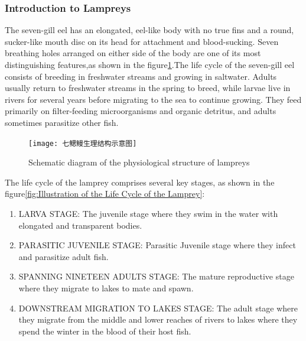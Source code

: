 \documentclass[CTeX = true]{mcmthesis}  %
\begin{document}
\subsubsection*{Introduction to Lampreys}
The seven-gill eel has an elongated, eel-like body with no true fins and a round, sucker-like mouth disc on its head for attachment and blood-sucking. Seven breathing holes arranged on either side of the body are one of its most distinguishing features,as shown in the figure\ref{fig:Schematic diagram of the physiological structure of lampreys}.The life cycle of the seven-gill eel consists of breeding in freshwater streams and growing in saltwater\cite{ionescu2021lampricide}. Adults usually return to freshwater streams in the spring to breed, while larvae live in rivers for several years before migrating to the sea to continue growing. They feed primarily on filter-feeding microorganisms and organic detritus, and adults sometimes parasitize other fish.
\begin{figure}[htbp]
       \centering    
   \texttt{[image: 七鳃鳗生理结构示意图]}
     \caption{Schematic diagram of the physiological structure of lampreys}
     \label{fig:Schematic diagram of the physiological structure of lampreys}
\end{figure}

The life cycle of the lamprey comprises several key stages, as shown in the figure\ref{fig:Illustration of the Life Cycle of the Lamprey}:

\begin{enumerate}
\item LARVA STAGE: The juvenile stage where they swim in the water with elongated and transparent bodies.
\item PARASITIC JUVENILE STAGE: Parasitic Juvenile stage where they infect and parasitize adult fish.
\item SPANNING NINETEEN ADULTS STAGE: The mature reproductive stage where they migrate to lakes to mate and spawn.
\item DOWNSTREAM MIGRATION TO LAKES STAGE: The adult stage where they migrate from the middle and lower reaches of rivers to lakes where they spend the winter in the blood of their host fish. 
\end{enumerate}
\end{document}
